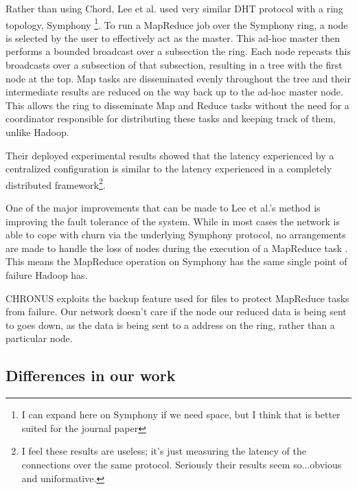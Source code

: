 \documentclass[conference, compsocconf, letterpaper]{IEEEtran}
\begin{document}
Rather than using Chord, Lee et al. used very similar DHT protocol with a ring topology, Symphony \cite{symphony}\footnote{I can expand here on Symphony if we need space, but I think that is better suited for the journal paper}.  To run a MapReduce job over the Symphony ring, a node is selected by the user to effectively act as the master.  This ad-hoc master then performs a bounded broadcast over a subsection the ring.  Each node repeasts this broadcasts over a subsection of that subsection, resulting in a tree with the first node at the top.  Map tasks are disseminated evenly throughout the tree and their intermediate results are reduced on the way back up to the ad-hoc master node.  This allows the ring to disseminate Map and Reduce tasks without the need for a coordinator responsible for distributing these tasks and keeping track of them, unlike Hadoop.
 

Their deployed experimental results showed that the latency experienced by a centralized configuration is similar to the latency experienced in a completely distributed framework\footnote{I feel these results are useless; it's just measuring the latency of the connections over the same protocol.  Seriously their results seem so...obvious and uniformative.}.

One of the major improvements that can be made to Lee et al.'s method is improving the fault tolerance of the system.  While in most cases the network is able to cope with churn via the underlying Symphony protocol, no arrangements are made to handle the loss of nodes during the execution of a MapReduce task \cite{leemap}.  This means the MapReduce operation on Symphony has the same single point of failure Hadoop has. 

CHRONUS exploits the backup feature used for files to protect MapReduce tasks from failure.  Our network doesn't care if the node our reduced data is being sent to goes down, as the data is being sent to a address on the ring, rather than a particular node.

\subsection{Differences in our work}
\end{document}
